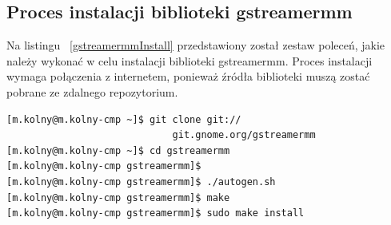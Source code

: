 \documentclass[12pt]{article}
\begin{document}
\subsection{Proces instalacji biblioteki gstreamermm}
Na listingu ~\ref{gstreamermmInstall} przedstawiony został zestaw poleceń, jakie należy wykonać w celu instalacji biblioteki gstreamermm. Proces instalacji wymaga połączenia z internetem, ponieważ źródła biblioteki muszą zostać pobrane ze zdalnego repozytorium.
\begin{lstlisting}[caption=Polecenia kompilujące program gst-creator, label=gstreamermmInstall]
[m.kolny@m.kolny-cmp ~]$ git clone git://
                             git.gnome.org/gstreamermm
[m.kolny@m.kolny-cmp ~]$ cd gstreamermm
[m.kolny@m.kolny-cmp gstreamermm]$ 
[m.kolny@m.kolny-cmp gstreamermm]$ ./autogen.sh
[m.kolny@m.kolny-cmp gstreamermm]$ make
[m.kolny@m.kolny-cmp gstreamermm]$ sudo make install
\end{lstlisting}
\end{document}
